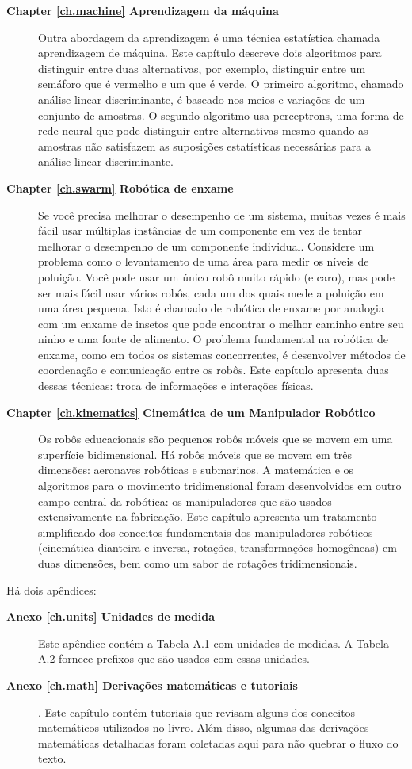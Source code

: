 \begin{description}
\item [\textbf{Chapter \ref{ch.machine} Aprendizagem da máquina}] Outra abordagem da aprendizagem é uma técnica estatística chamada aprendizagem de máquina. Este capítulo descreve dois algoritmos para distinguir entre duas alternativas, por exemplo, distinguir entre um semáforo que é vermelho e um que é verde. O primeiro algoritmo, chamado análise linear discriminante, é baseado nos meios e variações de um conjunto de amostras. O segundo algoritmo usa perceptrons, uma forma de rede neural que pode distinguir entre alternativas mesmo quando as amostras não satisfazem as suposições estatísticas necessárias para a análise linear discriminante.

\item [\textbf{Chapter \ref{ch.swarm} Robótica de enxame}] Se você precisa melhorar o desempenho de um sistema, muitas vezes é mais fácil usar múltiplas instâncias de um componente em vez de tentar melhorar o desempenho de um componente individual. Considere um problema como o levantamento de uma área para medir os níveis de poluição. Você pode usar um único robô muito rápido (e caro), mas pode ser mais fácil usar vários robôs, cada um dos quais mede a poluição em uma área pequena. Isto é chamado de robótica de enxame por analogia com um enxame de insetos que pode encontrar o melhor caminho entre seu ninho e uma fonte de alimento. O problema fundamental na robótica de enxame, como em todos os sistemas concorrentes, é desenvolver métodos de coordenação e comunicação entre os robôs. Este capítulo apresenta duas dessas técnicas: troca de informações e interações físicas.

\item [\textbf{Chapter \ref{ch.kinematics} Cinemática de um Manipulador Robótico}] Os robôs educacionais são pequenos robôs móveis que se movem em uma superfície bidimensional. Há robôs móveis que se movem em três dimensões: aeronaves robóticas e submarinos. A matemática e os algoritmos para o movimento tridimensional foram desenvolvidos em outro campo central da robótica: os manipuladores que são usados extensivamente na fabricação. Este capítulo apresenta um tratamento simplificado dos conceitos fundamentais dos manipuladores robóticos (cinemática dianteira e inversa, rotações, transformações homogêneas) em duas dimensões, bem como um sabor de rotações tridimensionais.
\end{description}

Há dois apêndices:
\begin{description}
\item [\textbf{Anexo \ref{ch.units} Unidades de medida}] Este apêndice contém a Tabela A.1 com unidades de medidas. A Tabela A.2 fornece prefixos que são usados com essas unidades.

\item [\textbf{Anexo \ref{ch.math} Derivações matemáticas e tutoriais}]. Este capítulo contém tutoriais que revisam alguns dos conceitos matemáticos utilizados no livro. Além disso, algumas das derivações matemáticas detalhadas foram coletadas aqui para não quebrar o fluxo do texto.
\end{description}

